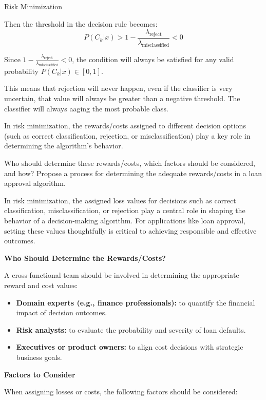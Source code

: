 \documentclass[
	english,
        solution=true
	]{tudaexercise}
\begin{document}
\begin{task}[points=11]{Risk Minimization}
\begin{subtask}[points=1]
\begin{solution}
Then the threshold in the decision rule becomes:
\[
P(C_k | x) > 1 - \frac{\lambda_\text{reject}}{\lambda_\text{misclassified}} < 0
\]

Since $1 - \frac{\lambda_\text{reject}}{\lambda_\text{misclassified}} < 0$, the condition will always be satisfied for any valid probability $P(C_k | x) \in [0, 1]$.

This means that rejection will never happen, even if the classifier is very uncertain, that value will always be greater than a negative threshold.
The classifier will always aaging the most probable class.

\end{solution}
\end{subtask}
\newpage
\begin{subtask}[points=5]
In risk minimization, the rewards/costs assigned to different decision options (such as correct classification, rejection, or misclassification) play a key role in determining the algorithm’s behavior.

Who should determine these rewards/costs, which factors should be considered, and how? Propose a process for determining the adequate rewards/costs in a loan approval algorithm.

\begin{solution}
In risk minimization, the assigned loss values for decisions such as correct classification, misclassification, or rejection play a central role in shaping the behavior of a decision-making algorithm. For applications like loan approval, setting these values thoughtfully is critical to achieving responsible and effective outcomes.

\textbf{Who Should Determine the Rewards/Costs?}

A cross-functional team should be involved in determining the appropriate reward and cost values:

\begin{itemize}
    \item \textbf{Domain experts (e.g., finance professionals):} to quantify the financial impact of decision outcomes.
    \item \textbf{Risk analysts:} to evaluate the probability and severity of loan defaults.
    \item \textbf{Executives or product owners:} to align cost decisions with strategic business goals.
\end{itemize}

\textbf{Factors to Consider}

When assigning losses or costs, the following factors should be considered:


\end{solution}
\end{subtask}
\end{task}
\end{document}
